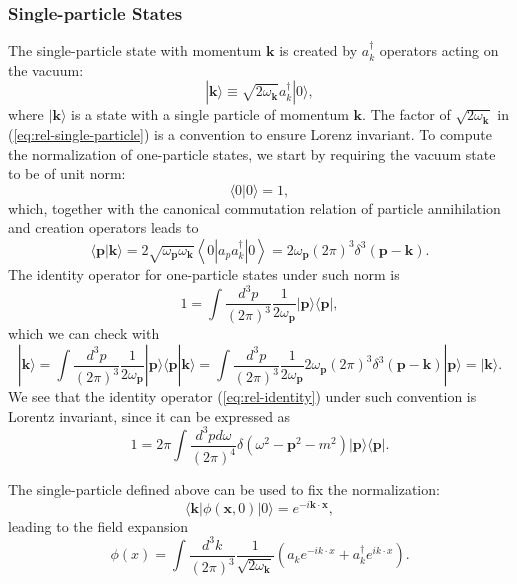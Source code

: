 \subsubsection{Single-particle States}
The single-particle state with momentum $\bm k$ is created by $a_{k}^{\dagger}$ operators acting on the vacuum:
\begin{equation}
	|\bm{k}\rangle \equiv \sqrt{2\omega_{\bm k}} a_{k}^{\dagger}|0\rangle,
	\label{eq:rel-single-particle}
\end{equation}
where $|\bm{k}\rangle$ is a state with a single particle of momentum $\bm{k}$.
The factor of $\sqrt{2 \omega_{\bm k}}$ in (\ref{eq:rel-single-particle}) is a convention to ensure Lorenz invariant.
To compute the normalization of one-particle states, we start by requiring the vacuum state to be of unit norm:
\begin{equation}
	\langle 0|0\rangle=1,
\end{equation}
which, together with the canonical commutation relation of particle annihilation and creation operators leads to
\begin{equation}
	\langle\bm{p}|\bm{k}\rangle 
	= 2\sqrt{\omega_{\bm p} \omega_{\bm k}}\left\langle 0\left|a_{p} a_{k}^{\dagger}\right| 0\right\rangle
	= 2 \omega_{\bm p}(2\pi)^{3} \delta^{3}(\bm{p}-\bm{k}).
\end{equation}
The identity operator for one-particle states under such norm is
\begin{equation}
	1=\int \frac{d^{3} p}{(2\pi)^{3}} \frac{1}{2\omega_{\bm p}}|\bm{p}\rangle\langle\bm{p}|, \label{eq:rel-identity}
\end{equation}
which we can check with
\begin{equation*}
	|\bm{k}\rangle
	=\int \frac{d^{3} p}{(2\pi)^{3}} \frac{1}{2\omega_{\bm p}}|\bm{p}\rangle\langle\bm{p}|\bm{k}\rangle
	=\int \frac{d^{3} p}{(2\pi)^{3}} \frac{1}{2\omega_{\bm p}} 2\omega_{\bm p}(2\pi)^3 \delta^3(\bm{p}-\bm{k})|\bm{p}\rangle
	=|\bm{k}\rangle.
\end{equation*}
We see that the identity operator (\ref{eq:rel-identity}) under such convention is Lorentz invariant, since it can be expressed as
\begin{equation}
	1 = 2\pi \int \frac{d^{3} p d\omega}{(2\pi)^{4}} \delta(\omega^2-{\bm{p}}^2-m^2) |\bm p\rangle\langle \bm p|.
\end{equation}

The single-particle defined above can be used to fix the normalization:
\begin{equation}
	\langle \bm k|\phi(\bm x,0)|0\rangle = e^{-i \bm k\cdot \bm x},
\end{equation}
leading to the field expansion
\begin{equation}
	\phi(x)
	=\int \frac{d^{3} k}{(2\pi)^{3}} \frac{1}{\sqrt{2\omega_{\bm k}}}\left(a_k 
		e^{-i k \cdot x}+a_k^{\dagger} e^{i k \cdot x}\right).
\end{equation}

